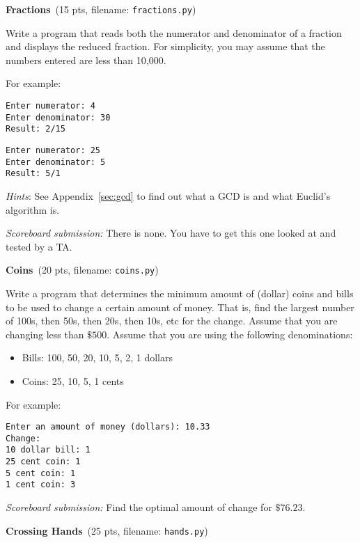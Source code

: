 \documentclass[11pt]{cselabheader}
\newcommand{\cop}[3]{\textbf{#1}~(#2 pts, filename: \texttt{#3})\quad}
\theoremstyle{plain}
\begin{document}
\begin{enumerate}
	\item \cop{Fractions}{15}{fractions.py}
		
		Write a program that reads both the numerator and denominator of
		a fraction and displays the reduced fraction. For simplicity, you
		may assume that the numbers entered are less than 10,000. 
		
		For example:
		\begin{lstlisting}[style=bash]
Enter numerator: 4
Enter denominator: 30
Result: 2/15
		\end{lstlisting}

		\begin{lstlisting}[style=bash]
Enter numerator: 25
Enter denominator: 5
Result: 5/1
		\end{lstlisting}

		\textit{Hints}: See Appendix~\ref{sec:gcd} to find out what a GCD is 
		and what Euclid's algorithm is. 

		\textit{Scoreboard submission:} There is none. You have to get this one
		looked at and tested by a TA.

	\item \cop{Coins}{20}{coins.py}

		Write a program that determines the minimum amount of (dollar) coins 
		and bills to be used to change a certain amount of money. That is, find
		the largest number of 100s, then 50s, then 20s, then 10s, etc for the
		change. Assume that you are changing less than $\$500$. Assume that
		you are using the following denominations:
		\begin{itemize}
			\item Bills: 100, 50, 20, 10, 5, 2, 1 dollars
			\item Coins: 25, 10, 5, 1 cents
		\end{itemize}

		For example:
		\begin{lstlisting}[style=bash]
Enter an amount of money (dollars): 10.33
Change:
10 dollar bill: 1
25 cent coin: 1
5 cent coin: 1
1 cent coin: 3
		\end{lstlisting}

		\textit{Scoreboard submission:} Find the optimal amount of change for
		$\$76.23$. 


	\item \cop{Crossing Hands}{25}{hands.py}


\end{enumerate}
\end{document}
